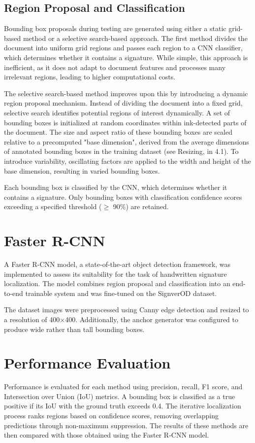 \documentclass[a4paper,12pt]{article}
\begin{document}
\subsection{Region Proposal and Classification}
Bounding box proposals during testing are generated using either a static grid-based method or a selective search-based approach. The first method divides the document into uniform grid regions and passes each region to a CNN classifier, which determines whether it contains a signature. While simple, this approach is inefficient, as it does not adapt to document features and processes many irrelevant regions, leading to higher computational costs.

The selective search-based method improves upon this by introducing a dynamic region proposal mechanism. Instead of dividing the document into a fixed grid, selective search identifies potential regions of interest dynamically. A set of bounding boxes is initialized at random coordinates within ink-detected parts of the document. The size and aspect ratio of these bounding boxes are scaled relative to a precomputed "base dimension", derived from the average dimensions of annotated bounding boxes in the training dataset (see Resizing, in 4.1). To introduce variability, oscillating factors are applied to the width and height of the base dimension, resulting in varied bounding boxes. 

Each bounding box is classified by the CNN, which determines whether it contains a signature. Only bounding boxes with classification confidence scores exceeding a specified threshold ($\ge$ 90\%) are retained.


\section{Faster R-CNN}
A Faster R-CNN model, a state-of-the-art object detection framework, was implemented to assess its suitability for the task of handwritten signature localization. The model combines region proposal and classification into an end-to-end trainable system and was fine-tuned on the SignverOD dataset.

The dataset images were preprocessed using Canny edge detection and resized to a resolution of 400×400. Additionally, the anchor generator was configured to produce wide rather than tall bounding boxes.

\section{Performance Evaluation}
Performance is evaluated for each method using precision, recall, F1 score, and Intersection over Union (IoU) metrics. A bounding box is classified as a true positive if its IoU with the ground truth exceeds 0.4. The iterative localization process ranks regions based on confidence scores, removing overlapping predictions through non-maximum suppression. The results of these methods are then compared with those obtained using the Faster R-CNN model.
\end{document}
